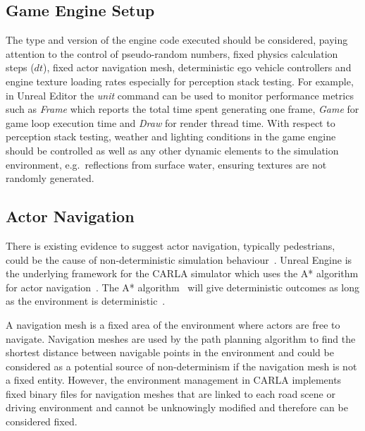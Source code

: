 \documentclass[letterpaper, 10 pt, journal, twoside]{IEEEtran}
\begin{document}
\subsection{Game Engine Setup}
The type and version of the engine code executed should be considered, paying attention to the control of pseudo-random numbers, fixed physics calculation steps ($dt$), fixed actor navigation mesh, deterministic ego vehicle controllers and engine texture loading rates especially for perception stack testing. %
%
For example, in Unreal Editor the \textit{unit}\cite{stat_commands} command can be used to monitor performance metrics such as \textit{Frame} which reports 
the total time spent generating one frame, \textit{Game} for game loop execution time and \textit{Draw} for render thread time. 
%
With respect to perception stack testing, weather and lighting conditions in the game engine should be controlled as well as any other dynamic elements to the simulation environment, e.g.\ reflections from surface water, ensuring textures are not randomly generated. 




\subsection{Actor Navigation}
There is existing evidence to suggest actor navigation, typically pedestrians, could be the cause of non-deterministic simulation behaviour~\cite{CARLABenchmark}.
% 
Unreal Engine is the underlying framework for the CARLA simulator which uses the A* algorithm for actor navigation~\cite{a_Star_oreilly}.
%
The A* algorithm~\cite{AStarBook} will give deterministic outcomes as long as the environment is deterministic~\cite{AirsimUnrealArticle, UnrealAIDocumentation}. 

A navigation mesh is a fixed area of the environment where actors are free to navigate.
%
Navigation meshes are used by the path planning algorithm to find the shortest distance between navigable points in the environment and could be considered as a potential source of non-determinism if the navigation mesh is not a fixed entity. %
%
However, the environment management in CARLA implements fixed binary files for navigation meshes that are linked to each road scene or driving environment and cannot be unknowingly modified and therefore can be considered fixed. 
\end{document}
